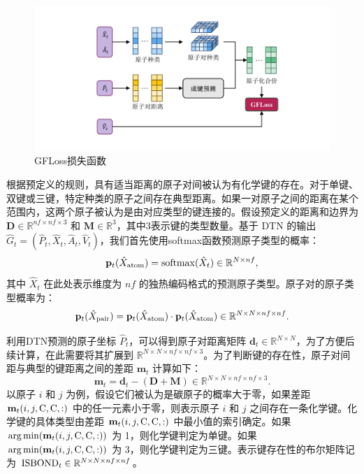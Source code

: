 \begin{figure}[h]
    \centering
    \includegraphics[width=\linewidth]{figures/gfloss.png}
    \caption{GFLoss损失函数}
    \label{fig:gfloss}
\end{figure} 

根据预定义的规则，具有适当距离的原子对间被认为有化学键的存在。对于单键、双键或三键，特定种类的原子之间存在典型距离。如果一对原子之间的距离在某个范围内，这两个原子被认为是由对应类型的键连接的。假设预定义的距离和边界为 $\mathbf{D} \in \mathbb{R}^{nf \times nf \times 3}$ 和 $\mathbf{M} \in \mathbb{R}^{3}$，其中3表示键的类型数量。基于 DTN 的输出 $\hat{G}_t = (\hat{P}_t, \hat{X}_t, \hat{A}_t, \hat{V}_t)$，我们首先使用softmax函数预测原子类型的概率：
\begin{equation}
    {\mathbf{p}}_t(\hat{X}_{{\rm atom}}) = {\rm softmax}(\hat{X}_t) \in \mathbb{R}^{N \times nf},
\end{equation}
其中 $\hat{X}_t$ 在此处表示维度为 $nf$ 的独热编码格式的预测原子类型。原子对的原子类型概率为：
\begin{equation}
    {\mathbf{p}}_t(\hat{X}_{{\rm pair}}) = {\mathbf{p}}_t(\hat{X}_{{\rm atom}}) \cdot {\mathbf{p}}_t(\hat{X}_{{\rm atom}}) \in \mathbb{R}^{N \times N \times nf \times nf}.
\end{equation}

利用DTN预测的原子坐标 $\hat{P}_t$，可以得到原子对距离矩阵 $\mathbf{d}_t \in \mathbb{R}^{N \times N}$，为了方便后续计算，在此需要将其扩展到 $\mathbb{R}^{N \times N \times nf \times nf \times 3}$。为了判断键的存在性，原子对间距与典型的键距离之间的差距 $\mathbf{m}_t$ 计算如下：
\begin{equation}
    \mathbf{m}_t = \mathbf{d}_t - (\mathbf{D} + \mathbf{M}) \in \mathbb{R}^{N \times N \times nf \times nf \times 3}.
\end{equation}
以原子 $i$ 和 $j$ 为例，假设它们被认为是碳原子的概率大于零，如果差距$\mathbf{m}_t(i,j,{\rm C},{\rm C},:)$ 中的任一元素小于零，则表示原子 $i$ 和 $j$ 之间存在一条化学键。化学键的具体类型由差距 $\mathbf{m}_t(i,j,{\rm C},{\rm C},:)$ 中最小值的索引确定。如果 $\arg\min (\mathbf{m}_t(i,j,{\rm C},{\rm C},:))$ 为 1，则化学键判定为单键。如果 $\arg\min (\mathbf{m}_t(i,j,{\rm C},{\rm C},:))$ 为 3，则化学键判定为三键。表示键存在性的布尔矩阵记为 ${\rm ISBOND}_t \in \mathbb{R}^{N \times N \times nf \times nf}$。

